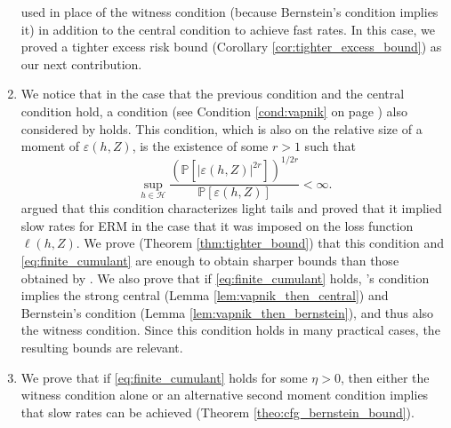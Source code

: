 \documentclass{uvamath}
\newcommand*{\calH}{\mathcal{H}}
\newcommand*{\bbP}{\mathbb{P}}
\theoremstyle{remark}
\theoremstyle{definition}
\theoremstyle{definition}
\theoremstyle{definition}
\theoremstyle{definition}
\theoremstyle{definition}
\begin{document}
\begin{enumerate}
  used in place of the witness condition (because Bernstein's
  condition implies it) in addition to the central condition to
  achieve fast rates. In this case, we proved a tighter excess risk
  bound (Corollary \ref{cor:tighter_excess_bound}) as our next
  contribution.
\item We notice that in the case that the previous condition and the
  central condition hold, a condition (see Condition
  \ref{cond:vapnik} on page \pageref{cond:vapnik}) also considered by
  \citet{vapnik_statistical_1998} holds. This condition, which is also
  on the relative size of a moment of $\varepsilon(h,Z)$, is the
  existence of some $r>1$ such that
  \begin{equation*}
    \sup_{h\in\calH}\frac{(\bbP[|\varepsilon(h,Z)|^{2r}])^{1/2r}}{\bbP[\varepsilon(h,Z)]} <
    \infty.
  \end{equation*}
  \citet{vapnik_statistical_1998} argued that this condition
  characterizes light tails and proved that it implied slow rates for
  ERM in the case that it was imposed on the loss function
  $\ell(h,Z)$. We prove (Theorem \ref{thm:tighter_bound}) that this
  condition and \eqref{eq:finite_cumulant} are enough to obtain
  sharper bounds than those obtained by \citet{grunwald_fast_2016}. We
  also prove that if \eqref{eq:finite_cumulant} holds,
  \citeauthor{vapnik_statistical_1998}'s condition implies the strong
  central (Lemma \ref{lem:vapnik_then_central}) and Bernstein's
  condition (Lemma \ref{lem:vapnik_then_bernstein}), and thus also the
  witness condition. Since this condition holds in many practical
  cases, the resulting bounds are relevant.
\item We prove that if \eqref{eq:finite_cumulant} holds for some
  $\eta>0$, then either the witness condition alone or an alternative
  second moment condition implies that slow rates can be achieved
  (Theorem \ref{theo:cfg_bernstein_bound}).
\end{enumerate}
\end{document}

